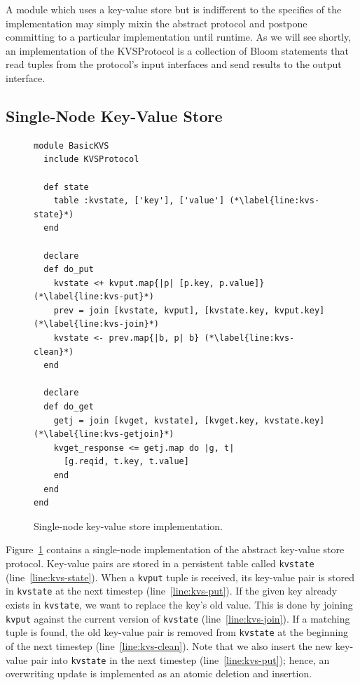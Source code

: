 A module which uses a key-value store but is indifferent to the specifics of the
implementation may simply mixin the abstract protocol and postpone committing to
a particular implementation until runtime. As we will see shortly, an
implementation of the KVSProtocol is a collection of Bloom statements that read
tuples from the protocol's input interfaces and send results to the output
interface.

\subsection{Single-Node Key-Value Store}
\label{sec:simple-kvs}
\begin{figure}[t]
\begin{scriptsize}
\begin{lstlisting}
module BasicKVS
  include KVSProtocol

  def state
    table :kvstate, ['key'], ['value'] (*\label{line:kvs-state}*)
  end

  declare
  def do_put
    kvstate <+ kvput.map{|p| [p.key, p.value]} (*\label{line:kvs-put}*) 
    prev = join [kvstate, kvput], [kvstate.key, kvput.key] (*\label{line:kvs-join}*)
    kvstate <- prev.map{|b, p| b} (*\label{line:kvs-clean}*)
  end

  declare
  def do_get
    getj = join [kvget, kvstate], [kvget.key, kvstate.key] (*\label{line:kvs-getjoin}*)
    kvget_response <= getj.map do |g, t|
      [g.reqid, t.key, t.value]
    end
  end
end
\end{lstlisting}
\centering
\vspace{-10pt}
\caption{Single-node key-value store implementation.}
\label{fig:kvs-impl}
\end{scriptsize}
\vspace{-2pt}
\end{figure}

Figure~\ref{fig:kvs-impl} contains a single-node implementation of the abstract
key-value store protocol. Key-value pairs are stored in a persistent table
called \texttt{kvstate} (line~\ref{line:kvs-state}). When a \texttt{kvput} tuple
is received, its key-value pair is stored in \texttt{kvstate} at the next
timestep (line~\ref{line:kvs-put}).  If the given key already exists
in \texttt{kvstate}, we want to replace the key's old value. This is done by
joining \texttt{kvput} against the current version of \texttt{kvstate}
(line~\ref{line:kvs-join}). If a matching tuple is found, the old key-value pair
is removed from \texttt{kvstate} at the beginning of the next timestep
(line~\ref{line:kvs-clean}). Note that we also insert the new key-value pair
into \texttt{kvstate} in the next timestep (line~\ref{line:kvs-put}); hence, an
overwriting update is implemented as an atomic deletion and insertion.

